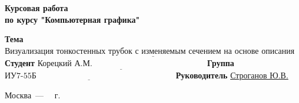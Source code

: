 \begin{titlepage}
  
  \begin{center}
    \Large\textbf{Курсовая работа\\\hspace{2.25cm} по курсу "Компьютерная графика"}\newline
  \end{center}
  
  \noindent\textbf{Тема} $\underline{\text{Визуализация тонкостенных трубок с изменяемым сечением на основе описания поперечных сечений}}$\newline\newline\newline
  \noindent\textbf{Студент} $\underline{\text{Корецкий А.М.~~~~~~~~~~~~~~~~~~~~~~~~~~~~~~~~~~~~~~~~~}}$\newline\newline
  \noindent\textbf{Группа} $\underline{\text{ИУ7-55Б~~~~~~~~~~~~~~~~~~~~~~~~~~~~~~~~~~~~~~~~~~~~~~~~~~}}$\newline\newline
  \noindent\textbf{Руководитель} \underline{Строганов Ю.В.}\newline
  
  \begin{center}
    \vfill
    Москва~---~\the\year
    ~г.
  \end{center}
 \restoregeometry
\end{titlepage}